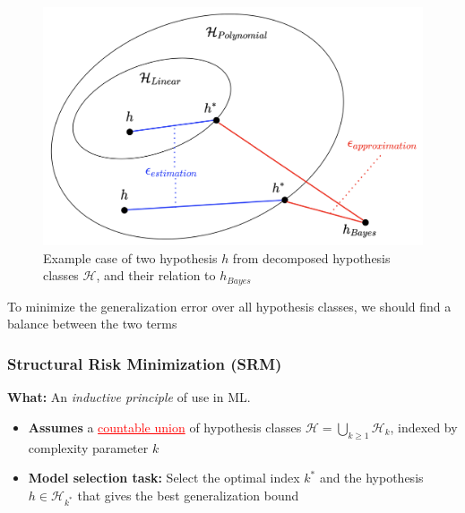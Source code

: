 \documentclass[12pt, a4paper]{article}
\begin{document}
\begin{figure}[H]
  \centering  %
    \includegraphics[width=0.9\columnwidth]{images/estimation-approximation-error-in-different-hypothesis-classes.png}
    \caption{Example case of two hypothesis $h$ from decomposed hypothesis classes $\mathcal{H}$, and their relation to $h_{Bayes}$}
    \label{fig:estimation-approximation-error-in-different-hypothesis-classes}
\end{figure}

To minimize the generalization error over all hypothesis classes, we should find a balance between the two terms













\subsubsection{Structural Risk Minimization (SRM)}\label{structural-risk-minimization}

\textbf{What:} An \textit{inductive principle} of use in ML.

\begin{itemize}
  \item \textbf{Assumes} a \textcolor{red}{\uline{countable union}} of hypothesis classes $\mathcal{H} = \bigcup_{k \geq 1} \mathcal{H}_k$, indexed by complexity parameter $k$
  \item \textbf{Model selection task:} Select the optimal index $k^*$ and the hypothesis $h \in \mathcal{H}_{k^*}$ that gives the best generalization bound
\end{itemize}
\end{document}
